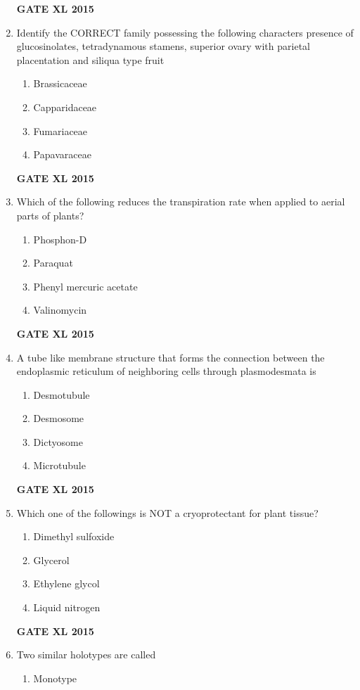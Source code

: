 \documentclass[journal,12pt,onecolumn]{IEEEtran}
\begin{document}
\begin{enumerate}
\begin{enumerate}
	\end{enumerate}
\hfill{\textbf{GATE XL 2015}}
\item Identify the CORRECT family possessing the following characters presence of glucosinolates, tetradynamous stamens, superior ovary with parietal placentation and siliqua type fruit
        \begin{enumerate} 
            \item Brassicaceae
	    \item Capparidaceae
	    \item Fumariaceae
            \item Papavaraceae
    \end{enumerate}
\hfill{\textbf{GATE XL 2015}}
\item Which of the following reduces the transpiration rate when applied to aerial parts of plants?
    \begin{enumerate}
            \item Phosphon-D
	    \item Paraquat
	    \item Phenyl mercuric acetate
            \item Valinomycin
    \end{enumerate}
\hfill{\textbf{GATE XL 2015}}
\item A tube like membrane structure that forms the connection between the endoplasmic reticulum of neighboring cells through plasmodesmata is
    \begin{enumerate}
            \item Desmotubule
	    \item Desmosome
	    \item Dictyosome
            \item Microtubule  
    \end{enumerate}
\hfill{\textbf{GATE XL 2015}}
\item Which one of the followings is NOT a cryoprotectant for plant tissue?
    \begin{enumerate}
            \item Dimethyl sulfoxide
	    \item Glycerol
	    \item Ethylene glycol
            \item Liquid nitrogen
    \end{enumerate}
\hfill{\textbf{GATE XL 2015}}
\item Two similar holotypes are called
    \begin{enumerate}
            \item Monotype

\end{enumerate}
\end{enumerate}
\end{document}
